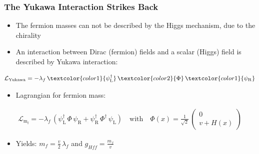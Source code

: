\documentclass[xcolor={usenames,dvipsnames,svgnames,table}]{beamer}
\begin{document}
\begin{frame}
    \frametitle{The Yukawa Interaction Strikes Back}
    \begin{itemize}
        \item The fermion masses can not be described by the Higgs mechanism, due to the chirality
        \item An interaction between \textcolor{color1}{Dirac (fermion) fields} and a \textcolor{color2}{scalar (Higgs) field} is described by Yukawa interaction:
    \end{itemize}
    \begin{gather*}
        \label{eq_lagrangian_yukawa}
        \mathcal{L}_\mathrm{Yukawa} = - \lambda_f \, \textcolor{color1}{\ensuremath{\psi}\xspace_\mathrm{L}^\dagger} \, \textcolor{color2}{\Phi} \, \textcolor{color1}{\ensuremath{\psi}\xspace_\mathrm{R}}
    \end{gather*}
    \begin{itemize}
        \item Lagrangian for fermion mass:
    \end{itemize}
    \begin{gather*}
        \label{eq_lagrandian_mf}
        \mathcal{L}_\mathrm{m_f}= - \lambda_f \, (\ensuremath{\psi}\xspace_\mathrm{L}^\dagger \, \Phi \, \ensuremath{\psi}\xspace_\mathrm{R}+ \ensuremath{\psi}\xspace_\mathrm{R}^\dagger \, \Phi^\dagger \, \ensuremath{\psi}\xspace_\mathrm{L}) \quad \text{with} \quad \Phi(x) = \frac{1}{\sqrt 2} \, \begin{pmatrix} 0 \\ v + H(x) \end{pmatrix}
    \end{gather*}
    \begin{itemize}
        \item Yields: $m_f = \frac{v}{2} \, \lambda_f$ and $g_{Hff} = \frac{m_f}{v}$
    \end{itemize}
\end{frame}


{ %
    \begin{frame}[plain]
     \end{frame}
		 \begin{frame}[plain]
      \end{frame}
}
\end{document}
